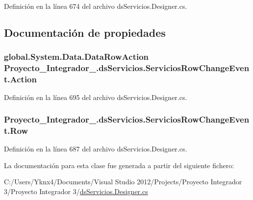 Definición en la línea 674 del archivo ds\-Servicios.\-Designer.\-cs.



\subsection{Documentación de propiedades}
\hypertarget{class_proyecto___integrador__3_1_1ds_servicios_1_1_servicios_row_change_event_aec3aca217f6b4c8f2a4e3f6d15d875cc}{
\subsubsection[{Action}]{\setlength{\rightskip}{0pt plus 5cm}global.\-System.\-Data.\-Data\-Row\-Action Proyecto\-\_\-\-Integrador\-\_.\-ds\-Servicios.\-Servicios\-Row\-Change\-Event.\-Action\hspace{0.3cm}{\ttfamily [get]}}}\label{class_proyecto___integrador__3_1_1ds_servicios_1_1_servicios_row_change_event_aec3aca217f6b4c8f2a4e3f6d15d875cc}


Definición en la línea 695 del archivo ds\-Servicios.\-Designer.\-cs.

\hypertarget{class_proyecto___integrador__3_1_1ds_servicios_1_1_servicios_row_change_event_a512b019ea6afe14ff0fab96bdae1b003}{
\subsubsection[{Row}]{ Proyecto\-\_\-\-Integrador\-\_.\-ds\-Servicios.\-Servicios\-Row\-Change\-Event.\-Row\hspace{0.3cm}{\ttfamily [get]}}}\label{class_proyecto___integrador__3_1_1ds_servicios_1_1_servicios_row_change_event_a512b019ea6afe14ff0fab96bdae1b003}


Definición en la línea 687 del archivo ds\-Servicios.\-Designer.\-cs.



La documentación para esta clase fue generada a partir del siguiente fichero\-:\begin{DoxyCompactItemize}
\item 
C\-:/\-Users/\-Yknx4/\-Documents/\-Visual Studio 2012/\-Projects/\-Proyecto Integrador 3/\-Proyecto Integrador 3/\hyperlink{ds_servicios_8_designer_8cs}{ds\-Servicios.\-Designer.\-cs}\end{DoxyCompactItemize}
